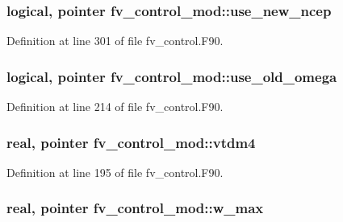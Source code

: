 \subsubsection[{use\-\_\-new\-\_\-ncep}]{\setlength{\rightskip}{0pt plus 5cm}logical, pointer fv\-\_\-control\-\_\-mod\-::use\-\_\-new\-\_\-ncep\hspace{0.3cm}{\ttfamily [private]}}\label{classfv__control__mod_a02a42143570e966aa1c87122b8d6e49a}


Definition at line 301 of file fv\-\_\-control.\-F90.

\subsubsection[{use\-\_\-old\-\_\-omega}]{\setlength{\rightskip}{0pt plus 5cm}logical, pointer fv\-\_\-control\-\_\-mod\-::use\-\_\-old\-\_\-omega\hspace{0.3cm}{\ttfamily [private]}}\label{classfv__control__mod_a47cc705f642ad3e11f7ae4bef4d35572}


Definition at line 214 of file fv\-\_\-control.\-F90.

\subsubsection[{vtdm4}]{\setlength{\rightskip}{0pt plus 5cm}real, pointer fv\-\_\-control\-\_\-mod\-::vtdm4\hspace{0.3cm}{\ttfamily [private]}}\label{classfv__control__mod_a5ea33e8ef19009f42a071cbd5c861413}


Definition at line 195 of file fv\-\_\-control.\-F90.

\subsubsection[{w\-\_\-max}]{\setlength{\rightskip}{0pt plus 5cm}real, pointer fv\-\_\-control\-\_\-mod\-::w\-\_\-max\hspace{0.3cm}{\ttfamily [private]}}\label{classfv__control__mod_a913483ee0df1ec846e1a3ebd4f8b183e}


